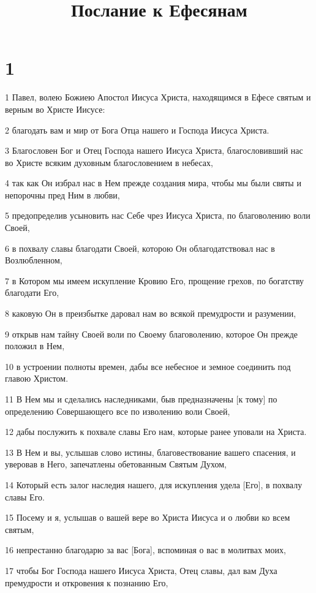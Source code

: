 

\title{Послание к Ефесянам}


\chapter{1}

\par 1 Павел, волею Божиею Апостол Иисуса Христа, находящимся в Ефесе святым и верным во Христе Иисусе:
\par 2 благодать вам и мир от Бога Отца нашего и Господа Иисуса Христа.
\par 3 Благословен Бог и Отец Господа нашего Иисуса Христа, благословивший нас во Христе всяким духовным благословением в небесах,
\par 4 так как Он избрал нас в Нем прежде создания мира, чтобы мы были святы и непорочны пред Ним в любви,
\par 5 предопределив усыновить нас Себе чрез Иисуса Христа, по благоволению воли Своей,
\par 6 в похвалу славы благодати Своей, которою Он облагодатствовал нас в Возлюбленном,
\par 7 в Котором мы имеем искупление Кровию Его, прощение грехов, по богатству благодати Его,
\par 8 каковую Он в преизбытке даровал нам во всякой премудрости и разумении,
\par 9 открыв нам тайну Своей воли по Своему благоволению, которое Он прежде положил в Нем,
\par 10 в устроении полноты времен, дабы все небесное и земное соединить под главою Христом.
\par 11 В Нем мы и сделались наследниками, быв предназначены [к тому] по определению Совершающего все по изволению воли Своей,
\par 12 дабы послужить к похвале славы Его нам, которые ранее уповали на Христа.
\par 13 В Нем и вы, услышав слово истины, благовествование вашего спасения, и уверовав в Него, запечатлены обетованным Святым Духом,
\par 14 Который есть залог наследия нашего, для искупления удела [Его], в похвалу славы Его.
\par 15 Посему и я, услышав о вашей вере во Христа Иисуса и о любви ко всем святым,
\par 16 непрестанно благодарю за вас [Бога], вспоминая о вас в молитвах моих,
\par 17 чтобы Бог Господа нашего Иисуса Христа, Отец славы, дал вам Духа премудрости и откровения к познанию Его,

